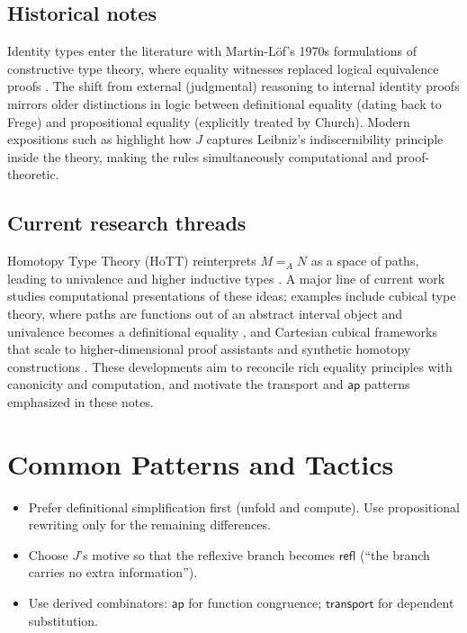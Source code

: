 \documentclass[11pt]{article}
\newcommand{\Id}[3]{#1 =_{#2} #3}
\newcommand{\refl}{\mathsf{refl}}
\newcommand{\ap}{\mathsf{ap}}
\newcommand{\transport}{\mathsf{transport}}
\theoremstyle{definition}
\theoremstyle{plain}
\theoremstyle{remark}
\begin{document}
\subsection{Historical notes}
Identity types enter the literature with Martin-L\"of's 1970s formulations of constructive type theory, where equality witnesses replaced logical equivalence proofs \cite{martinloef1984itt}. The shift from external (judgmental) reasoning to internal identity proofs mirrors older distinctions in logic between definitional equality (dating back to Frege) and propositional equality (explicitly treated by Church). Modern expositions such as \cite{harper2016pfpl} highlight how $J$ captures Leibniz's indiscernibility principle inside the theory, making the rules simultaneously computational and proof-theoretic.

\subsection{Current research threads}
Homotopy Type Theory (HoTT) reinterprets $\Id{M}{A}{N}$ as a space of paths, leading to univalence and higher inductive types \cite{hottbook}. A major line of current work studies computational presentations of these ideas; examples include cubical type theory, where paths are functions out of an abstract interval object and univalence becomes a definitional equality \cite{cchm2018cubical}, and Cartesian cubical frameworks that scale to higher-dimensional proof assistants and synthetic homotopy constructions \cite{angiuli2019cartesian}. These developments aim to reconcile rich equality principles with canonicity and computation, and motivate the transport and $\ap$ patterns emphasized in these notes.

\section{Common Patterns and Tactics}
\begin{itemize}
  \item Prefer definitional simplification first (unfold and compute). Use propositional rewriting only for the remaining differences.
  \item Choose $J$'s motive so that the reflexive branch becomes $\refl$ (``the branch carries no extra information'').
  \item Use derived combinators: $\ap$ for function congruence; $\transport$ for dependent substitution.
\end{itemize}
\end{document}
